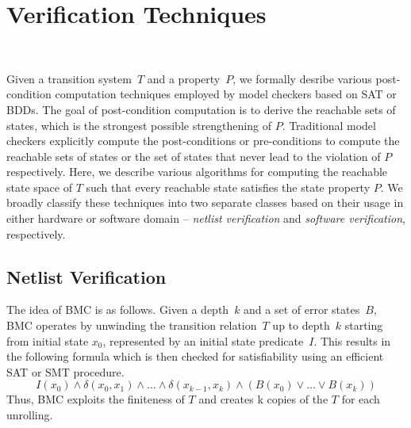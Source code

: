 \section{Verification Techniques}~\label{methodology}

Given a transition system~$T$ and a property~$P$, we formally desribe 
various post-condition computation techniques employed by
model checkers based on SAT or BDDs.  The goal of post-condition computation
is to derive the reachable sets of states, which is the strongest possible
strengthening of $P$.  Traditional model checkers explicitly compute the
post-conditions or pre-conditions to compute the reachable sets of states or
the set of states that never lead to the violation of $P$ respectively. 
Here, we describe various algorithms for computing the reachable state space
of $T$ such that every reachable state satisfies the state property $P$. We 
broadly classify these techniques into two separate classes based on their 
usage in either hardware or software domain -- \emph{netlist verification} and 
\emph{software verification}, respectively. 

\subsection{Netlist Verification}
%
%
The idea of BMC is as follows. 
Given a depth~$k$ and a set of error states~$B$, BMC operates
by unwinding the transition relation~$T$ up to depth~$k$ starting from
initial state $x_0$, represented by an initial state predicate~$I$.
This results in the following formula which is then checked for
satisfiability using an efficient SAT or SMT procedure.
%
\[ I(x_0) \wedge \delta(x_0, x_1) \wedge \ldots 
   \wedge \delta(x_{k-1}, x_k) \wedge (B(x_0) \vee \ldots \vee B(x_k)) \]
%
Thus, BMC exploits the finiteness of $T$ and creates k copies of the
$T$ for each unrolling.

